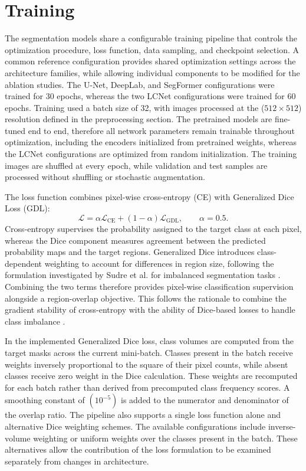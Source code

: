 \section{Training}

The segmentation models share a configurable training pipeline that controls the optimization procedure, loss function, data sampling, and checkpoint selection. A common reference configuration provides shared optimization settings across the architecture families, while allowing individual components to be modified for the ablation studies. The U-Net, DeepLab, and SegFormer configurations were trained for 30 epochs, whereas the two LCNet configurations were trained for 60 epochs. Training used a batch size of 32, with images processed at the (\(512 \times 512\)) resolution defined in the preprocessing section. The pretrained models are fine-tuned end to end, therefore all network parameters remain trainable throughout optimization, including the encoders initialized from pretrained weights, whereas the LCNet configurations are optimized from random initialization. The training images are shuffled at every epoch, while validation and test samples are processed without shuffling or stochastic augmentation.

The loss function combines pixel-wise cross-entropy (CE) with Generalized Dice Loss (GDL):
\begin{equation}
    \mathcal{L}
    =
    \alpha \mathcal{L}_{\mathrm{CE}}
    +
    (1-\alpha)\mathcal{L}_{\mathrm{GDL}},
    \qquad \alpha = 0.5.
    \label{eq}
\end{equation}
Cross-entropy supervises the probability assigned to the target class at each pixel, whereas the Dice component measures agreement between the predicted probability maps and the target regions. Generalized Dice introduces class-dependent weighting to account for differences in region size, following the formulation investigated by Sudre et al. for imbalanced segmentation tasks \cite{sudre2017generalizeddice}. Combining the two terms therefore provides pixel-wise classification supervision alongside a region-overlap objective. This follows the rationale to combine the gradient stability of cross-entropy with the ability of Dice-based losses to handle class imbalance \cite{yeung2022unified}.

In the implemented Generalized Dice loss, class volumes are computed from the target masks across the current mini-batch. Classes present in the batch receive weights inversely proportional to the square of their pixel counts, while absent classes receive zero weight in the Dice calculation. These weights are recomputed for each batch rather than derived from precomputed class frequency scores. A smoothing constant of \((10^{-5})\) is added to the numerator and denominator of the overlap ratio. The pipeline also supports a single loss function alone and alternative Dice weighting schemes. The available configurations include inverse-volume weighting or uniform weights over the classes present in the batch. These alternatives allow the contribution of the loss formulation to be examined separately from changes in architecture.

